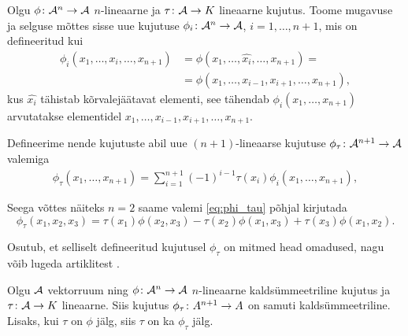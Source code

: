 Olgu $\phi \colon \mathcal{A}^n \to \mathcal{A}$ $n$-lineaarne ja
$\tau \colon \mathcal{A} \to K$ lineaarne kujutus. Toome mugavuse
ja selguse mõttes sisse uue kujutuse $\phi_i \colon \mathcal{A}^n \to \mathcal{A}$,
$i = 1, \dots, n+1$, mis on defineeritud kui
\begin{align*}
    \phi_i\left(x_1, \dots, x_i, \dots, x_{n+1}\right) &=
    \phi \left(x_1, \dots, \hat{x_i}, \dots, x_{n+1}\right) = \\
    &= \phi \left(x_1, \dots, x_{i-1}, x_{i+1}, \dots, x_{n+1}\right),
\end{align*}
kus $\hat{x_i}$ tähistab kõrvalejäätavat elementi, see tähendab
$\phi_i(x_1, \dots, x_{n+1})$ arvutatakse elementidel
$x_1, \dots, x_{i-1}, x_{i+1}, \dots, x_{n+1}$.

Defineerime nende
kujutuste abil uue $(n+1)$-lineaarse kujutuse
$\phi_\tau \colon \mathcal{A}^{n+1} \to \mathcal{A}$ valemiga
\begin{align}\label{eq:phi_tau}
    \phi_\tau \left( x_1, \dots, x_{n+1} \right) =
    \sum_{i=1}^{n+1} (-1)^{i-1} \tau(x_i)
        \phi_i(x_1, \dots, x_{n+1}),
\end{align}


Seega võttes näiteks $n = 2$ saame valemi \eqref{eq:phi_tau}
põhjal kirjutada
\[
    \phi_\tau (x_1, x_2, x_3) =
        \tau(x_1) \phi(x_2, x_3) -
        \tau(x_2) \phi(x_1, x_3) +
        \tau(x_3) \phi(x_1, x_2).
\]

Osutub, et selliselt defineeritud kujutusel $\phi_\tau$ on
mitmed head omadused, nagu võib lugeda artiklitest \cite{AKMS:2014,AMS:2011}.

\begin{lemma}
    Olgu $\mathcal{A}$ vektorruum ning $\phi \colon \mathcal{A}^n \to \mathcal{A}$ $n$-lineaarne
    kaldsümmeetriline kujutus ja $\tau \colon \mathcal{A} \to K$ lineaarne.
    Siis kujutus $\phi_\tau \colon A^{n+1} \to A$ on samuti
    kaldsümmeetriline. Lisaks, kui $\tau$ on $\phi$ jälg, siis
    $\tau$ on ka $\phi_\tau$ jälg.
\end{lemma}

